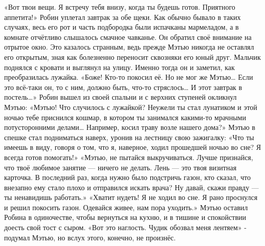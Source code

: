 \documentclass[a4paper,12pt]{book}
\begin{document}
	«Вот твои вещи. Я встречу тебя внизу, когда ты будешь готов. Приятного аппетита!»
	Робин уплетал завтрак за обе щеки. Как обычно бывало в таких случаях, весь его рот и часть подбородка были испачканы мармеладом, а в комнате отчётливо слышалось смачное чавканье.
	Он обратил своё внимание на отрытое окно. Это казалось странным, ведь прежде Мэтью никогда не оставлял его открытым, зная как болезненно переносит сквозняки его юный друг. Мальчик поднялся с кровати и выглянул на улицу. Именно тогда он и заметил, как преобразилась лужайка.
	«Боже! Кто-то покосил её. Но не мог же Мэтью… Если это всё-таки он, то с ним, должно быть, что-то стряслось… И этот завтрак в постель…»
	Робин вышел из своей спальни и с верхних ступеней окликнул Мэтью:
	«Мэтью! Что случилось с лужайкой? Неужели ты стал лунатиком и этой ночью тебе приснился кошмар, в котором ты занимался какими-то мрачными потусторонними делами… Например, косил траву возле нашего дома?»
	Мэтью в спешке стал подниматься наверх, уронив на лестницу свою зажигалку:
	«Что ты имеешь в виду, говоря о том, что я, наверное, ходил прошедшей ночью во сне? Я всегда готов помогать!»
	«Мэтью, не пытайся выкручиваться. Лучше признайся, что твоё любимое занятие — ничего не делать. Лень — это твоя визитная карточка. В последний раз, когда нужно было подстричь газон, кто сказал, что внезапно ему стало плохо и отправился искать врача? Ну давай, скажи правду — ты ненавидишь работать.»
	«Хватит нудеть! Я не ходил во сне. Я рано проснулся и решил покосить газон. Одевайся живее, нам пора уходить.»
	Мэтью оставил Робина в одиночестве, чтобы вернуться на кухню, и в тишине и спокойствии доесть свой тост с сыром.
	«Вот это наглость. Чудик обозвал меня лентяем» - подумал Мэтью, но вслух этого, конечно, не произнёс.
	
\end{document}
